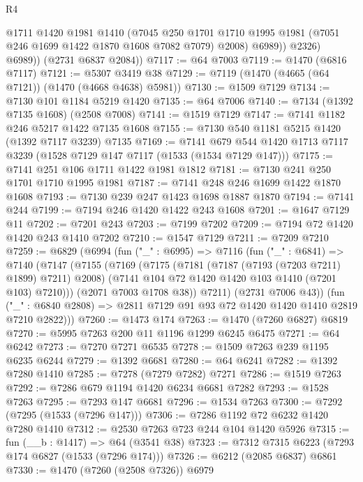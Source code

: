 \begin{lexlean}{R4}
\begin{coremodule}
                @1711
                @1420
                @1981
                @1410
                (@7045
                  @250
                  @1701
                  @1710
                  @1995
                  @1981
                  (@7051 @246 @1699 @1422 @1870 @1608 @7082 @7079)
                  @2008)
                @6989))
            @2326)
          @6989))
      (@2731 @6837 @2084))
@7117 := @64 @7003
@7119 := @1470 (@6816 @7117)
@7121 := @5307 @3419 @38
@7129 := @7119 (@1470 (@4665 (@64 @7121)) (@1470 (@4668 @4638) @5981))
@7130 := @1509 @7129
@7134 := @7130 @101 @1184 @5219 @1420
@7135 := @64 @7006
@7140 := @7134 (@1392 @7135 @1608) (@2508 @7008)
@7141 := @1519 @7129
@7147 := @7141 @1182 @246 @5217 @1422 @7135 @1608
@7155 := @7130 @540 @1181 @5215 @1420 (@1392 @7117 @3239) @7135
@7169 := @7141 @679 @544 @1420 @1713 @7117 @3239 (@1528 @7129 @147 @7117 (@1533 (@1534 @7129 @147)))
@7175 := @7141 @251 @106 @1711 @1422 @1981 @1812
@7181 := @7130 @241 @250 @1701 @1710 @1995 @1981
@7187 := @7141 @248 @246 @1699 @1422 @1870 @1608
@7193 := @7130 @239 @247 @1423 @1698 @1887 @1870
@7194 := @7141 @244
@7199 := @7194 @246 @1420 @1422 @243 @1608
@7201 := @1647 @7129 @11
@7202 := @7201 @243
@7203 := @7199 @7202
@7209 := @7194 @72 @1420 @1420 @243 @1410 @7202
@7210 := @1547 @7129
@7211 := @7209 @7210
@7259 := @6829
    (@6994
      (fun ("_" : @6995) =>
      @7116
        (fun ("_" : @6841) =>
        @7140
          (@7147
            (@7155
              (@7169
                (@7175
                  (@7181 (@7187 (@7193 (@7203 @7211) @1899) @7211) @2008)
                  (@7141 @104 @72 @1420 @1420 @103 @1410 (@7201 @103) @7210)))
              (@2071 @7003 @1708 @38))
            @7211)
          (@2731 @7006 @43))
        (fun ("_" : @6840 @2808) => @2811 @7129 @91 @93 @72 @1420 @1420 @1410 @2819 @7210 @2822)))
@7260 := @1473 @174
@7263 := @1470 (@7260 @6827) @6819
@7270 := @5995 @7263 @200 @11 @1196 @1299 @6245 @6475
@7271 := @64 @6242
@7273 := @7270 @7271 @6535
@7278 := @1509 @7263 @239 @1195 @6235 @6244
@7279 := @1392 @6681
@7280 := @64 @6241
@7282 := @1392 @7280 @1410
@7285 := @7278 (@7279 @7282) @7271
@7286 := @1519 @7263
@7292 := @7286 @679 @1194 @1420 @6234 @6681 @7282
@7293 := @1528 @7263
@7295 := @7293 @147 @6681
@7296 := @1534 @7263
@7300 := @7292 (@7295 (@1533 (@7296 @147)))
@7306 := @7286 @1192 @72 @6232 @1420 @7280 @1410
@7312 := @2530 @7263 @723 @244 @104 @1420 @5926
@7315 := fun (__b : @1417) => @64 (@3541 @38)
@7323 := @7312 @7315 @6223 (@7293 @174 @6827 (@1533 (@7296 @174)))
@7326 := @6212 (@2085 @6837) @6861
@7330 := @1470 (@7260 (@2508 @7326)) @6979

\end{coremodule}
\end{lexlean}
